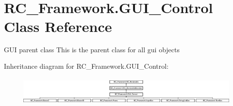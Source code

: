 \hypertarget{class_r_c___framework_1_1_g_u_i___control}{}\section{R\+C\+\_\+\+Framework.\+G\+U\+I\+\_\+\+Control Class Reference}
\label{class_r_c___framework_1_1_g_u_i___control}


G\+UI parent class This is the parent class for all gui objects  


Inheritance diagram for R\+C\+\_\+\+Framework.\+G\+U\+I\+\_\+\+Control\+:\begin{figure}[H]
\begin{center}
\leavevmode
\includegraphics[height=1.493333cm]{class_r_c___framework_1_1_g_u_i___control}
\end{center}
\end{figure}
